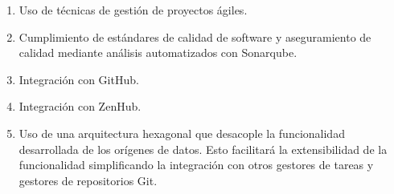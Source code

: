 \begin{enumerate}
	\item Uso de técnicas de gestión de proyectos ágiles.
	\item Cumplimiento de estándares de calidad de software y aseguramiento de calidad mediante análisis automatizados con Sonarqube.
	\item Integración con GitHub. 
	\item Integración con ZenHub.
	\item Uso de una arquitectura hexagonal \cite{hexagonal-architecture} que desacople la funcionalidad desarrollada de los orígenes de datos. Esto facilitará la extensibilidad de la funcionalidad simplificando la  integración con otros gestores de tareas y gestores de repositorios Git.
\end{enumerate}

